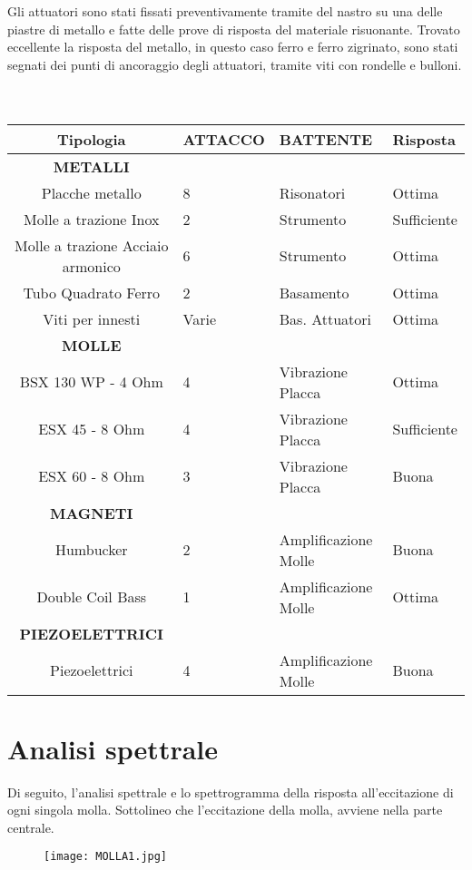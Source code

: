 Gli attuatori sono stati fissati preventivamente tramite del nastro su una delle piastre di metallo e fatte delle prove di risposta del materiale risuonante. Trovato eccellente la risposta del metallo, in questo caso ferro e ferro zigrinato, sono stati segnati dei punti di ancoraggio degli attuatori, tramite viti con rondelle e bulloni. \\ \\
\\
\begin{tabular}{cp{2cm}p{2cm}p{2cm}} \textbf{Tipologia}&\textbf{ATTACCO}&\textbf{BATTENTE}&\textbf{Risposta}\\
\hline \textbf{METALLI}\\
\hline Placche metallo&8&Risonatori&Ottima\\
\hline Molle a trazione Inox&2&Strumento&Sufficiente\\
\hline Molle a trazione Acciaio armonico&6&Strumento&Ottima\\
\hline Tubo Quadrato Ferro&2&Basamento&Ottima\\
\hline Viti per innesti&Varie&Bas. Attuatori&Ottima\\
\hline \textbf{MOLLE}\\
\hline BSX 130 WP - 4 Ohm&4&Vibrazione Placca&Ottima\\
\hline ESX 45 - 8 Ohm&4&Vibrazione Placca&Sufficiente\\
\hline ESX 60 - 8 Ohm&3&Vibrazione Placca&Buona\\
\hline \textbf{MAGNETI}\\
\hline Humbucker&2&Amplificazione Molle&Buona\\
\hline Double Coil Bass&1&Amplificazione Molle&Ottima\\
\hline \textbf{PIEZOELETTRICI} \\
\hline Piezoelettrici&4&Amplificazione Molle&Buona\\
\hline
\end{tabular}

\section{Analisi spettrale}
Di seguito, l'analisi spettrale e lo spettrogramma della risposta all'eccitazione di ogni singola molla. Sottolineo che l'eccitazione della molla, avviene nella parte centrale. \\

 \begin{figure}[htbp]
        \centering
        \texttt{[image: MOLLA1.jpg]}
\end{figure}

